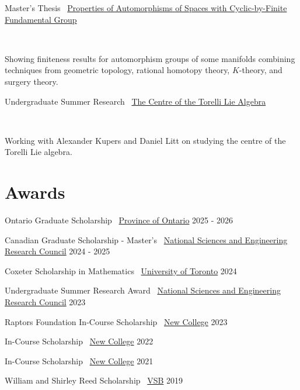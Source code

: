 \documentclass[]{style}
\begin{document}
\begin{entrylist}

\vspace{1mm}

\entry
{Master's Thesis \ {\normalfont \underline{Properties of Automorphisms of Spaces with Cyclic-by-Finite Fundamental Group}}}
{}
{ ~ \vspace{-2.5mm}

Showing finiteness results for automorphism groups of some manifolds combining techniques from geometric topology, rational homotopy theory, $K$-theory, and surgery theory.}

\entry
{Undergraduate Summer Research \ {\normalfont \underline{The Centre of the Torelli Lie Algebra}}}
{}
{ ~ \vspace{-2.5mm}

Working with Alexander Kupers and Daniel Litt on studying the centre of the Torelli Lie algebra.}

\end{entrylist}

\section{Awards}

\begin{entrylist}

\vspace{-3mm}
\entry
{Ontario Graduate Scholarship \ {\normalfont \underline{Province of Ontario}}}
{2025 - 2026}
{}

\vspace{-3mm}
\entry
{Canadian Graduate Scholarship - Master's \ {\normalfont \underline{National Sciences and Engineering Research Council}}}
{2024 - 2025}
{}

\vspace{-3mm}
\entry
{Coxeter Scholarship in Mathematics \ {\normalfont \underline{University of Toronto}}}
{2024}
{}

\vspace{-3mm}
\entry
{Undergraduate Summer Research Award \ {\normalfont \underline{National Sciences and Engineering Research Council}}}
{2023}
{}

\vspace{-3mm}
\entry
{Raptors Foundation In-Course Scholarship \ {\normalfont \underline{New College}}}
{2023}
{}

\vspace{-3mm}
\entry
{In-Course Scholarship \ {\normalfont \underline{New College}}}
{2022}
{}

\vspace{-3mm}
\entry
{In-Course Scholarship \ {\normalfont \underline{New College}}}
{2021}
{}

\vspace{-3mm}
\entry
{William and Shirley Reed Scholarship \ {\normalfont \underline{VSB}}}
{2019}
{}

\end{entrylist}
\end{document}
